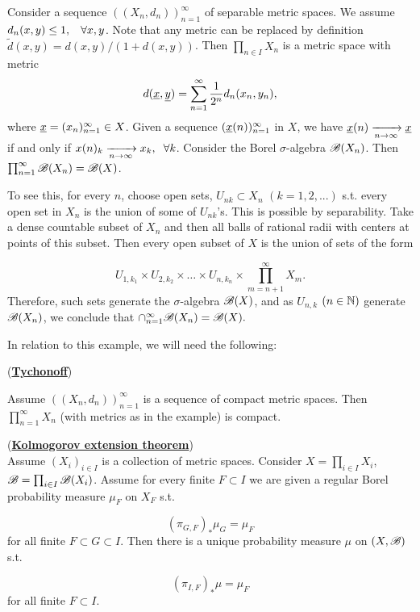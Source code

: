 \begin{example}

    Consider a sequence $((X_n,d_n))_{n=1}^\infty$ of separable metric spaces. We assume $d_n(x,y)\leq 1,\hspace{3mm}\forall x,y$. Note that any metric can be replaced by definition
    $\tilde d(x,y) = d(x,y)/(1+d(x,y))$. Then $\prod_{n\in I} X_n$ is a metric space with metric \[ d(\underline{x},\underline{y})=\sum_{n=1}^\infty \frac{1}{2^n}d_n(x_n,y_n), \]
    where $\underline{x} = (x_n)_{n=1}^\infty\in X$. Given a sequence $(\underline{x}(n))_{n=1}^\infty$ in $X$, we have $\underline{x}(n)\xrightarrow[n\rightarrow\infty]{}\underline{x}$ if and only if $x(n)_k\xrightarrow[n\rightarrow\infty]{}x_k,\hspace{2mm} \forall k$.
    Consider the Borel $\sigma$-algebra $\mathscr{B}(X_n)$. Then $\prod_{n=1}^\infty \mathscr{B}(X_n)=\mathscr{B}(X)$.

    To see this, for every $n$, choose open sets, $U_{nk}\subset X_n$ $(k=1,2,...)$ s.t. every open set in $X_n$ is the union of some of $U_{nk}$'s. This is possible by 
    separability. Take a dense countable subset of $X_n$ and then all balls of rational radii with centers at points of this subset. Then every open subset of $X$ is the 
    union of sets of the form 
    
    \[U_{1,k_1}\times U_{2,k_2}\times\ldots\times U_{n,k_n}\times \prod_{m=n+1}^\infty X_m.\]
    Therefore, such sets generate the $\sigma$-algebra $\mathscr{B}(X)$, and as $U_{n,k}$ $(n\in \mathbb{N})$ generate $\mathscr{B}(X_n)$, we conclude that $\cap_{n=1}^\infty \mathscr{B}(X_n)=\mathscr{B}(X).$
\end{example}

\begin{remark}
    In relation to this example, we will need the following:
\end{remark}

\begin{theorem}(\underline{\textbf{Tychonoff}})
    
    Assume $((X_n,d_n))_{n=1}^\infty$ is a sequence of compact metric spaces. Then $\prod_{n=1}^\infty X_n$ (with metrics as in the example) is compact. 
\end{theorem}

\begin{theorem}(\underline{\textbf{Kolmogorov extension theorem}})\\
    Assume $(X_i)_{i\in I}$ is a collection of metric spaces. Consider $X=\prod_{i\in I} X_i$, $\mathscr{B}=\prod_{i\in I} \mathscr{B}(X_i)$. Assume for every finite $F\subset I$ we are given 
    a regular Borel probability measure $\mu_F$ on $X_F$ s.t. 

    \[(\pi_{G,F})_*\mu_G = \mu_F\]
    for all finite $F\subset G\subset I$. Then there is a unique probability measure $\mu$ on $(X,\mathscr{B})$ s.t. 
    
    \[(\pi_{I,F})_*\mu=\mu_F\]
    for all finite $F\subset I$.
    
\end{theorem}

